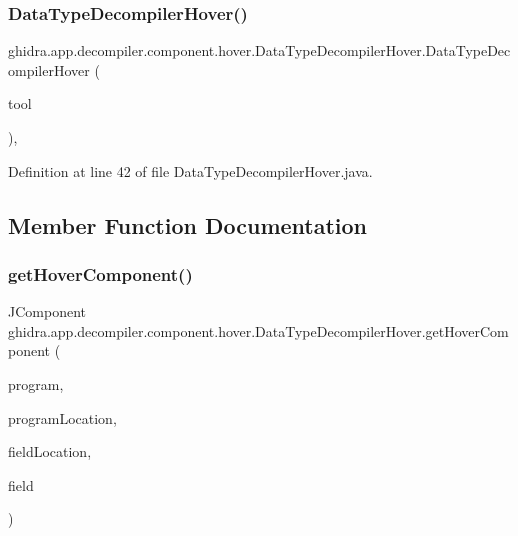 \subsubsection{\texorpdfstring{DataTypeDecompilerHover()}{DataTypeDecompilerHover()}}
{\footnotesize\ttfamily ghidra.\+app.\+decompiler.\+component.\+hover.\+Data\+Type\+Decompiler\+Hover.\+Data\+Type\+Decompiler\+Hover (\begin{DoxyParamCaption}\item[{Plugin\+Tool}]{tool }\end{DoxyParamCaption})\hspace{0.3cm}{\ttfamily [inline]}, {\ttfamily [protected]}}



Definition at line 42 of file Data\+Type\+Decompiler\+Hover.\+java.



\subsection{Member Function Documentation}
\mbox{\label{classghidra_1_1app_1_1decompiler_1_1component_1_1hover_1_1_data_type_decompiler_hover_a3f2f0f4aa1bc579e44d53e48dffad78b}} 
\subsubsection{\texorpdfstring{getHoverComponent()}{getHoverComponent()}}
{\footnotesize\ttfamily J\+Component ghidra.\+app.\+decompiler.\+component.\+hover.\+Data\+Type\+Decompiler\+Hover.\+get\+Hover\+Component (\begin{DoxyParamCaption}\item[{Program}]{program,  }\item[{Program\+Location}]{program\+Location,  }\item[{Field\+Location}]{field\+Location,  }\item[{Field}]{field }\end{DoxyParamCaption})\hspace{0.3cm}{\ttfamily [inline]}}



